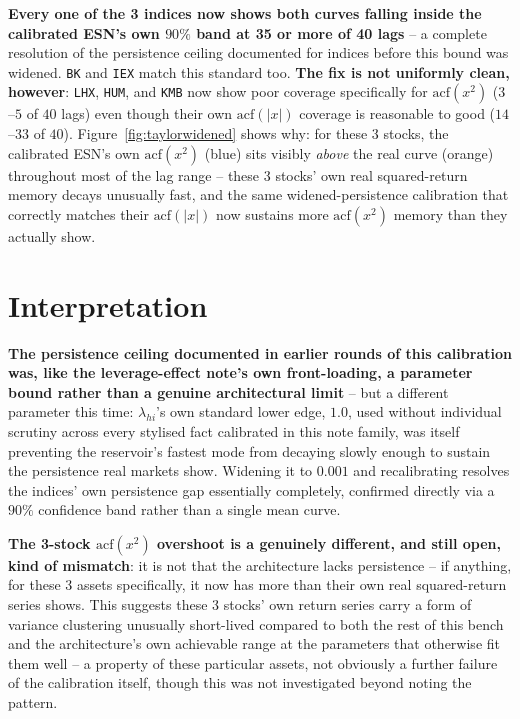 \documentclass[11pt]{article}
\begin{document}
\textbf{Every one of the 3 indices now shows both curves falling inside the
calibrated ESN's own $90\%$ band at 35 or more of 40 lags} -- a complete
resolution of the persistence ceiling documented for indices before this
bound was widened. \texttt{BK} and \texttt{IEX} match this standard too.
\textbf{The fix is not uniformly clean, however}: \texttt{LHX}, \texttt{HUM},
and \texttt{KMB} now show poor coverage specifically for
$\text{acf}(x^2)$ ($3$--$5$ of $40$ lags) even though their own
$\text{acf}(|x|)$ coverage is reasonable to good ($14$--$33$ of $40$).
Figure~\ref{fig:taylorwidened} shows why: for these 3 stocks, the calibrated
ESN's own $\text{acf}(x^2)$ (blue) sits visibly \emph{above} the real curve
(orange) throughout most of the lag range -- these 3 stocks' own real
squared-return memory decays unusually fast, and the same widened-persistence
calibration that correctly matches their $\text{acf}(|x|)$ now sustains more
$\text{acf}(x^2)$ memory than they actually show.

\section{Interpretation}
\textbf{The persistence ceiling documented in earlier rounds of this
calibration was, like the leverage-effect note's own front-loading, a
parameter bound rather than a genuine architectural limit} -- but a different
parameter this time: $\lambda_{hi}$'s own standard lower edge, $1.0$, used
without individual scrutiny across every stylised fact calibrated in this
note family, was itself preventing the reservoir's fastest mode from decaying
slowly enough to sustain the persistence real markets show. Widening it to
$0.001$ and recalibrating resolves the indices' own persistence gap
essentially completely, confirmed directly via a $90\%$ confidence band
rather than a single mean curve.

\textbf{The 3-stock $\text{acf}(x^2)$ overshoot is a genuinely different, and
still open, kind of mismatch}: it is not that the architecture lacks
persistence -- if anything, for these 3 assets specifically, it now has more
than their own real squared-return series shows. This suggests these 3
stocks' own return series carry a form of variance clustering unusually
short-lived compared to both the rest of this bench and the architecture's
own achievable range at the parameters that otherwise fit them well -- a
property of these particular assets, not obviously a further failure of the
calibration itself, though this was not investigated beyond noting the
pattern.
\end{document}
